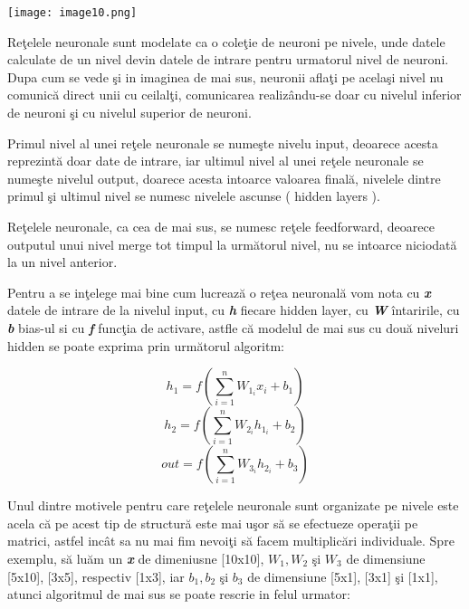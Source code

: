 \begin{center}
\texttt{[image: image10.png]}
\end{center}

Re\c{t}elele neuronale sunt modelate ca o cole\c{t}ie de neuroni pe nivele, unde datele calculate de un nivel devin datele de intrare pentru urmatorul nivel de neuroni. Dupa cum se vede \c{s}i in imaginea de mai sus, neuronii afla\c{t}i pe acela\c{s}i nivel nu comunic\u{a} direct unii cu ceilal\c{t}i, comunicarea realiz\^{a}ndu-se doar cu nivelul inferior de neuroni \c{s}i cu nivelul superior de neuroni.
\par
Primul nivel al unei re\c{t}ele neuronale se nume\c{s}te nivelu input, deoarece acesta reprezint\u{a} doar date de intrare, iar ultimul nivel al unei re\c{t}ele neuronale se nume\c{s}te nivelul output, doarece acesta intoarce valoarea final\u{a}, nivelele dintre primul \c{s}i ultimul nivel se numesc nivelele ascunse ( hidden layers ).
\par
Re\c{t}elele neuronale, ca cea de mai sus, se numesc re\c{t}ele feedforward, deoarece outputul unui nivel merge tot timpul la urm\u{a}torul nivel, nu se intoarce niciodat\u{a} la un nivel anterior.
\par 
Pentru a se in\c{t}elege mai bine cum lucreaz\u{a} o re\c{t}ea neuronal\u{a} vom nota cu \textbf{\textit{x}} datele de intrare de la nivelul input, cu \textbf{\textit{h}} fiecare hidden layer, cu \textbf{\textit{W}} \^{i}ntaririle, cu \textbf{\textit{b}} bias-ul si cu \textbf{\textit{f}} func\c{t}ia de activare, astfle c\u{a} modelul de mai sus cu dou\u{a} niveluri hidden se poate exprima prin urm\u{a}torul algoritm:

$$h_1 = f( \sum_{i=1}^{n} W_1_i x_i + b_1 ) $$
$$h_2 = f( \sum_{i=1}^{n} W_2_i h_1_i + b_2 ) $$
$$out = f( \sum_{i=1}^{n} W_3_i h_2_i + b_3 ) $$

\par

Unul dintre motivele pentru care re\c{t}elele neuronale sunt organizate pe nivele este acela c\u{a} pe acest tip de structur\u{a} este mai u\c{s}or s\u{a} se efectueze opera\c{t}ii pe matrici, astfel inc\^{a}t sa nu mai fim nevoi\c{t}i s\u{a} facem multiplic\u{a}ri individuale. Spre exemplu, s\u{a} lu\u{a}m un \textbf{\textit{x}} de dimeniusne [10x10], $W_1, W_2 $ \c{s}i $W_3$ de dimensiune [5x10], [3x5], respectiv [1x3], iar $b_1, b_2 $ \c{s}i $b_3$ de dimensiune [5x1], [3x1] \c{s}i [1x1], atunci algoritmul de mai sus se poate rescrie in felul urmator: 

